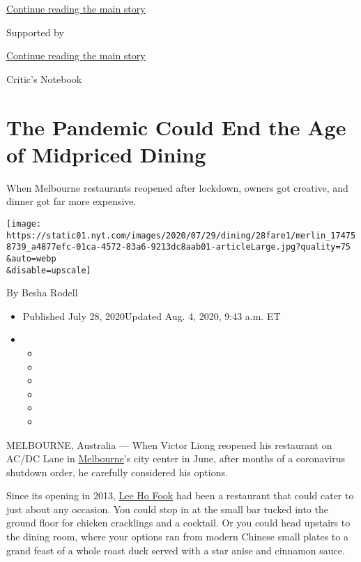 \protect\hyperlink{after-top}{Continue reading the main story}

Supported by

\protect\hyperlink{after-sponsor}{Continue reading the main story}

Critic's Notebook

\hypertarget{the-pandemic-could-end-the-age-of-midpriced-dining}{%
\section{The Pandemic Could End the Age of Midpriced
Dining}\label{the-pandemic-could-end-the-age-of-midpriced-dining}}

When Melbourne restaurants reopened after lockdown, owners got creative,
and dinner got far more expensive.

\texttt{[image: https://static01.nyt.com/images/2020/07/29/dining/28fare1/merlin\_174758739\_a4877efc-01ca-4572-83a6-9213dc8aab01-articleLarge.jpg?quality=75\\\&auto=webp\\\&disable=upscale]}

By Besha Rodell

\begin{itemize}
\item
  Published July 28, 2020Updated Aug. 4, 2020, 9:43 a.m. ET
\item
  \begin{itemize}
  \item
  \item
  \item
  \item
  \item
  \item
  \end{itemize}
\end{itemize}

MELBOURNE, Australia --- When Victor Liong reopened his restaurant on
AC/DC Lane in
\href{https://www.nytimes.com/2020/08/04/world/australia/coronavirus-melbourne-lockdown.html}{Melbourne}'s
city center in June, after months of a coronavirus shutdown order, he
carefully considered his options.

Since its opening in 2013, \href{https://www.leehofook.com.au/}{Lee Ho
Fook} had been a restaurant that could cater to just about any occasion.
You could stop in at the small bar tucked into the ground floor for
chicken cracklings and a cocktail. Or you could head upstairs to the
dining room, where your options ran from modern Chinese small plates to
a grand feast of a whole roast duck served with a star anise and
cinnamon sauce.

